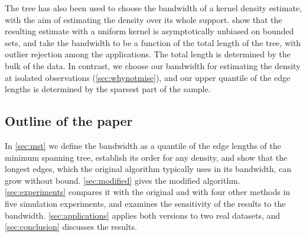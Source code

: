 The tree has also been used to choose the bandwidth of a kernel density estimate, with the aim of estimating the density over its whole support. \citet{Chaudhuri1996} show that the resulting estimate with a uniform kernel is asymptotically unbiased on bounded sets, and \citet{SreevaniMurthy2016} take the bandwidth to be a function of the total length of the tree, with outlier rejection among the applications. The total length is determined by the bulk of the data. In contrast, we choose our bandwidth for estimating the density at isolated observations (\cref{sec:whynotmise}), and our upper quantile of the edge lengths is determined by the sparsest part of the sample.

\subsection{Outline of the paper}

In \cref{sec:mst} we define the bandwidth as a quantile of the edge lengths of the minimum spanning tree, establish its order for any density, and show that the longest edges, which the original algorithm typically uses in its bandwidth, can grow without bound. \cref{sec:modified} gives the modified algorithm. \cref{sec:experiments} compares it with the original and with four other methods in five simulation experiments, and examines the sensitivity of the results to the bandwidth. \cref{sec:applications} applies both versions to two real datasets, and \cref{sec:conclusion} discusses the results.
